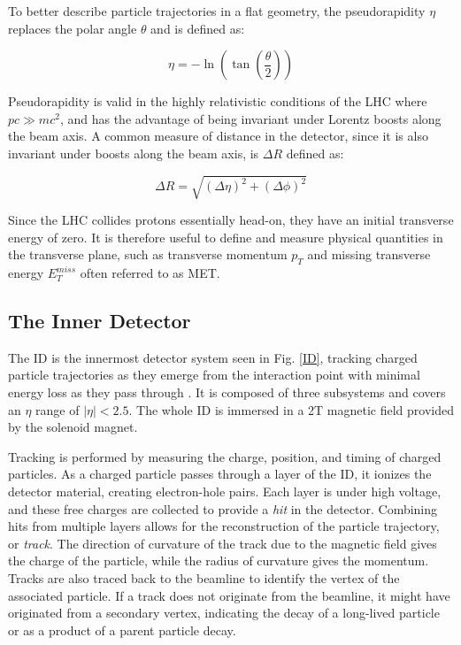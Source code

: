 To better describe particle trajectories in a flat geometry, the pseudorapidity $\eta$ replaces the polar angle $\theta$ and is defined as:

\begin{equation}\label{pseudorapidity}
    \eta = -\ln\left(\tan\left(\frac{\theta}{2}\right)\right)
\end{equation}

Pseudorapidity is valid in the highly relativistic conditions of the LHC where $pc \gg mc^2$, and has the advantage of being invariant under Lorentz boosts along the beam axis.
A common measure of distance in the detector, since it is also invariant under boosts along the beam axis, is $\Delta R$ defined as:

\begin{equation}\label{deltaR}
    \Delta R = \sqrt{(\Delta \eta)^2 + (\Delta \phi)^2}
\end{equation} 

Since the LHC collides protons essentially head-on, they have an initial transverse energy of zero.
It is therefore useful to define and measure physical quantities in the transverse plane, such as transverse momentum $p_T$ and missing transverse energy $E_T^{miss}$ often referred to as MET.

\subsection{The Inner Detector}\label{subsec:inner_detector}

The ID is the innermost detector system seen in Fig. \ref{ID}, tracking charged particle trajectories as they emerge from the interaction point with minimal energy loss as they pass through \cite{ATLAS-TDR-04}.
It is composed of three subsystems and covers an $\eta$ range of $|\eta| < 2.5$.
The whole ID is immersed in a 2T magnetic field provided by the solenoid magnet.

Tracking is performed by measuring the charge, position, and timing of charged particles.
As a charged particle passes through a layer of the ID, it ionizes the detector material, creating electron-hole pairs.
Each layer is under high voltage, and these free charges are collected to provide a \textit{hit} in the detector.
Combining hits from multiple layers allows for the reconstruction of the particle trajectory, or \textit{track}.
The direction of curvature of the track due to the magnetic field gives the charge of the particle, while the radius of curvature gives the momentum.
Tracks are also traced back to the beamline to identify the vertex of the associated particle. 
If a track does not originate from the beamline, it might have originated from a secondary vertex, indicating the decay of a long-lived particle or as a product of a parent particle decay.

